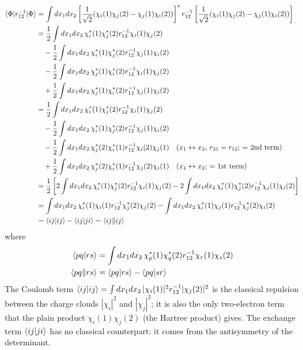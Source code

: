 \begin{align*}
\langle \Phi|r_{12}^{-1}|\Phi\rangle &= \int dx_1 dx_2 \left[ \frac{1}{\sqrt{2}} (\chi_i(1) \chi_j(2) - \chi_j(1) \chi_i(2)) \right]^* r_{12}^{-1} \left[ \frac{1}{\sqrt{2}} (\chi_i(1) \chi_j(2) - \chi_j(1) \chi_i(2)) \right] \\
&= \frac{1}{2} \int dx_1 dx_2\, \chi_i^*(1) \chi_j^*(2) r_{12}^{-1} \chi_i(1) \chi_j(2) \\
&\quad - \frac{1}{2} \int dx_1 dx_2\, \chi_i^*(1) \chi_j^*(2) r_{12}^{-1} \chi_j(1) \chi_i(2) \\
&\quad - \frac{1}{2} \int dx_1 dx_2\, \chi_j^*(1) \chi_i^*(2) r_{12}^{-1} \chi_i(1) \chi_j(2) \\
&\quad + \frac{1}{2} \int dx_1 dx_2\, \chi_j^*(1) \chi_i^*(2) r_{12}^{-1} \chi_j(1) \chi_i(2) \\
&= \frac{1}{2} \int dx_1 dx_2\, \chi_i^*(1) \chi_j^*(2) r_{12}^{-1} \chi_i(1) \chi_j(2) \\
&\quad - \frac{1}{2} \int dx_1 dx_2\, \chi_i^*(1) \chi_j^*(2) r_{12}^{-1} \chi_j(1) \chi_i(2) \\
&\quad - \frac{1}{2} \int dx_1 dx_2\, \chi_j^*(2) \chi_i^*(1) r_{12}^{-1} \chi_i(2) \chi_j(1) \quad\text{($x_1 \leftrightarrow x_2$, $r_{21} = r_{12}$; $=$ 2nd term)} \\
&\quad + \frac{1}{2} \int dx_1 dx_2\, \chi_j^*(2) \chi_i^*(1) r_{12}^{-1} \chi_j(2) \chi_i(1) \quad\text{($x_1 \leftrightarrow x_2$; $=$ 1st term)} \\
&= \frac{1}{2} \left[ 2 \int dx_1 dx_2\, \chi_i^*(1) \chi_j^*(2) r_{12}^{-1} \chi_i(1) \chi_j(2) - 2 \int dx_1 dx_2\, \chi_i^*(1) \chi_j^*(2) r_{12}^{-1} \chi_j(1) \chi_i(2) \right] \\
&= \int dx_1 dx_2\, \chi_i^*(1) \chi_i(1) r_{12}^{-1} \chi_j^*(2) \chi_j(2) - \int dx_1 dx_2\, \chi_i^*(1) \chi_j(1) r_{12}^{-1} \chi_j^*(2) \chi_i(2) \\
&= \langle ij\vert ij\rangle - \langle ij\vert ji\rangle = \langle ij\Vert ij\rangle
\end{align*}
where
\begin{align*}
\langle pq\vert rs\rangle &= \int dx_1 dx_2\, \chi_p^*(1) \chi_q^*(2) r_{12}^{-1} \chi_r(1) \chi_s(2) \\
\langle pq\Vert rs\rangle &= \langle pq\vert rs\rangle - \langle pq\vert sr\rangle
\end{align*}
The Coulomb term $\langle ij\vert ij\rangle = \int dx_1 dx_2\, |\chi_i(1)|^2 r_{12}^{-1} |\chi_j(2)|^2$ is the classical repulsion between the charge clouds $|\chi_i|^2$ and $|\chi_j|^2$; it is also the only two-electron term that the plain product $\chi_i(1) \chi_j(2)$ (the Hartree product) gives. The exchange term $\langle ij\vert ji\rangle$ has no classical counterpart: it comes from the antisymmetry of the determinant.


